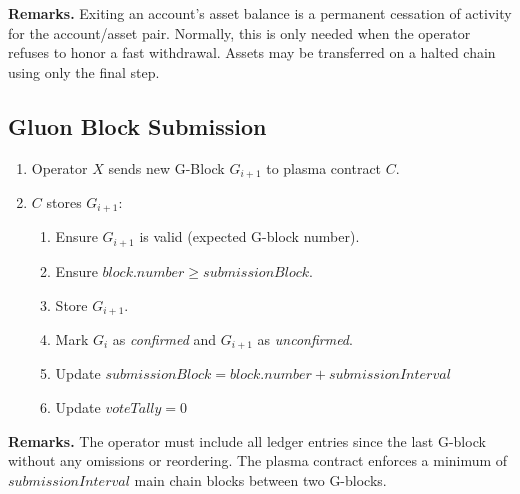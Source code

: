 \documentclass[12pt,a4paper]{article}
\begin{document}
\textbf{Remarks.}  Exiting an account’s asset balance is a permanent cessation of activity for the account/asset pair. Normally, this is only needed when the operator refuses to honor a fast withdrawal.  Assets may be transferred on a halted chain using only the final step.

\subsection{Gluon Block Submission}\label{gp:block}
\begin{mdframed}
\begin{enumerate}
    \item Operator $X$ sends new G-Block $G_{i+1}$ to plasma contract $C$.
    \item $C$ stores $G_{i+1}$:
    \begin{enumerate}
        \item Ensure $G_{i+1}$ is valid (expected G-block number).
        \item Ensure \(block.number \geq submissionBlock \).
        \item Store $G_{i+1}$.
        \item Mark $G_i$ as \emph{confirmed} and $G_{i+1}$ as \emph{unconfirmed}.
        \item Update \(submissionBlock = block.number + submissionInterval\)
        \item Update \(voteTally = 0\)
    \end{enumerate}
\end{enumerate}
\end{mdframed}

\textbf{Remarks.} The operator must include all ledger entries since the last G-block without any omissions or reordering. The plasma contract enforces a minimum  of $submissionInterval$ main chain blocks between two G-blocks. 
\end{document}
